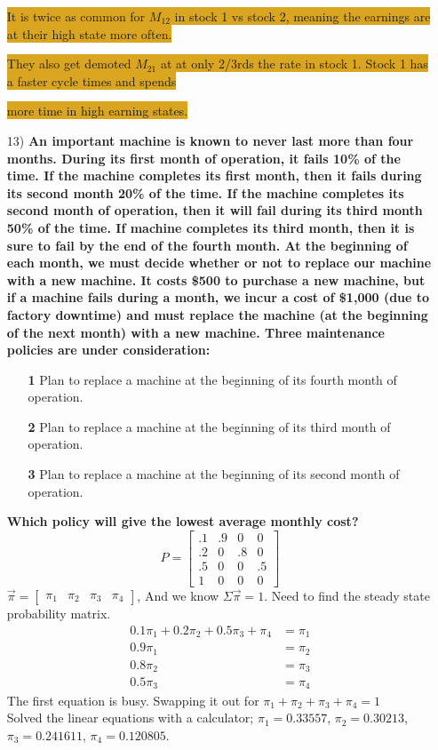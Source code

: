 \documentclass{article}
\begin{document}
\begin{enumerate}
\colorbox{Goldenrod}{It is twice as common for $M_{12}$ in stock 1 vs stock 2, meaning the earnings are at their high state more often. }

\colorbox{Goldenrod}{They also get demoted $M_{21}$ at at only 2/3rds the rate in stock 1. Stock 1 has a faster cycle times and spends}

\colorbox{Goldenrod}{more time in high earning states.}

\item[13) ] \textbf{An important machine is known to never last more than four months. During its first month of operation, it fails 10\% of the time. If the machine completes its first month, then it fails during its second month 20\% of the time. If the machine completes its second month of operation, then it will fail during its third month 50\% of the time. If  machine completes its third month, then it is sure to fail by the end of the fourth month. At the beginning of each month, we must decide whether or not to replace our machine with a new machine. It costs \$500 to purchase a new machine, but if a machine fails during a month, we incur a cost of \$1,000 (due to factory downtime) and must replace the machine (at the beginning of the next month) with a new machine. Three maintenance policies are under consideration:}

\begin{enumerate}
\item[\textbf{1}] Plan to replace a machine at the beginning of its fourth month of operation.
\item[\textbf{2}] Plan to replace a machine at the beginning of its third month of operation.
\item[\textbf{3}] Plan to replace a machine at the beginning of its second month of operation.
\end{enumerate}

\textbf{Which policy will give the lowest average monthly cost?}
\[
P = 
\begin{bmatrix}
.1 & .9 & 0 & 0\\
.2 & 0 & .8 & 0\\
.5 & 0 & 0 & .5\\
1 & 0 & 0 & 0
\end{bmatrix}
\]
$\vec{\pi} = \begin{bmatrix} \pi_1 & \pi_2 & \pi_3 & \pi_4 \end{bmatrix}$, And we know $\Sigma \vec{\pi} = 1. $ Need to find the steady state probability matrix.
\begin{align}
  0.1\pi_1 + 0.2\pi_2 + 0.5\pi_3 + \pi_4 &= \pi_1 \nonumber \\
  0.9\pi_1 &= \pi_2 \nonumber \\
  0.8\pi_2 &= \pi_3 \nonumber \\
  0.5\pi_3 &= \pi_4 \nonumber
\end{align}
The first equation is busy. Swapping it out for $\pi_1 + \pi_2 + \pi_3 + \pi_4 = 1$\\
Solved the linear equations with a calculator; $\pi_1 = 0.33557$, $\pi_2 = 0.30213$, $\pi_3 = 0.241611$, $\pi_4 = 0.120805$.


\end{enumerate}
\end{document}
